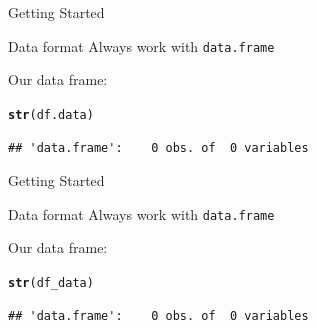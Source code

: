 \documentclass{beamer}\usepackage[]{graphicx}\usepackage[]{color}
\makeatletter
\newcommand{\hlstd}[1]{\textcolor[rgb]{0.345,0.345,0.345}{#1}}%
\newcommand{\hlkwd}[1]{\textcolor[rgb]{0.737,0.353,0.396}{\textbf{#1}}}%
\newenvironment{kframe}{%
 \def\at@end@of@kframe{}%
 \ifinner\ifhmode%
  \def\at@end@of@kframe{\end{minipage}}%
  \begin{minipage}{\columnwidth}%
 \fi\fi%
 \def\FrameCommand##1{\hskip\@totalleftmargin \hskip-\fboxsep
 \colorbox{shadecolor}{##1}\hskip-\fboxsep
     \hskip-\linewidth \hskip-\@totalleftmargin \hskip\columnwidth}%
 \MakeFramed {\advance\hsize-\width
   \@totalleftmargin\z@ \linewidth\hsize
   \@setminipage}}%
 {\par\unskip\endMakeFramed%
 \at@end@of@kframe}
\newenvironment{knitrout}{}{} %
\makeatother
\begin{document}
\begin{frame}[fragile]{Getting Started}

  \begin{alertblock}{Data format}
    Always work with \texttt{data.frame}
  \end{alertblock}
    Our data frame:
    
\begin{knitrout}
\color{fgcolor}\begin{kframe}
\begin{alltt}
  \hlkwd{str}\hlstd{(df.data)}
\end{alltt}
\begin{verbatim}
## 'data.frame':	0 obs. of  0 variables
\end{verbatim}
\end{kframe}
\end{knitrout}
    
\end{frame}

\begin{frame}[fragile]{Getting Started}

  \begin{alertblock}{Data format}
    Always work with \texttt{data.frame}
  \end{alertblock}
    Our data frame:
    
\begin{knitrout}
\color{fgcolor}\begin{kframe}
\begin{alltt}
  \hlkwd{str}\hlstd{(df_data)}
\end{alltt}
\begin{verbatim}
## 'data.frame':	0 obs. of  0 variables
\end{verbatim}
\end{kframe}
\end{knitrout}
    
\end{frame}
\end{document}
